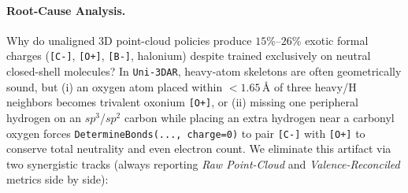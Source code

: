 \documentclass[11pt,a4paper]{article}
\begin{document}
\paragraph{Root-Cause Analysis.}
Why do unaligned 3D point-cloud policies produce $15\%\text{--}26\%$ exotic formal charges (\texttt{[C-]}, \texttt{[O+]}, \texttt{[B-]}, halonium) despite trained exclusively on neutral closed-shell molecules? In \texttt{Uni-3DAR}, heavy-atom skeletons are often geometrically sound, but (i) an oxygen atom placed within $< 1.65\,\text{\AA}$ of three heavy/H neighbors becomes trivalent oxonium \texttt{[O+]}, or (ii) missing one peripheral hydrogen on an $sp^3$/$sp^2$ carbon while placing an extra hydrogen near a carbonyl oxygen forces \texttt{DetermineBonds(..., charge=0)} \citep{rdkit2026bonds} to pair \texttt{[C-]} with \texttt{[O+]} to conserve total neutrality and even electron count. We eliminate this artifact via two synergistic tracks (always reporting \emph{Raw Point-Cloud} and \emph{Valence-Reconciled} metrics side by side):
\end{document}
